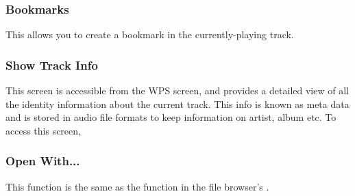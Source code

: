 \subsubsection{Bookmarks}
This allows you to create a bookmark in the currently-playing track.

\subsubsection{\label{ref:trackinfoviewer}Show Track Info}
This screen is accessible from the WPS screen, and provides a detailed view of
all the identity information about the current track. This info is known as
meta data and is stored in audio file formats to keep information on artist,
album etc. To access this screen, %
%
%
%
\subsubsection{Open With...}
This  function is the same as the  
function in the file browser's \setting{Context Menu}.

